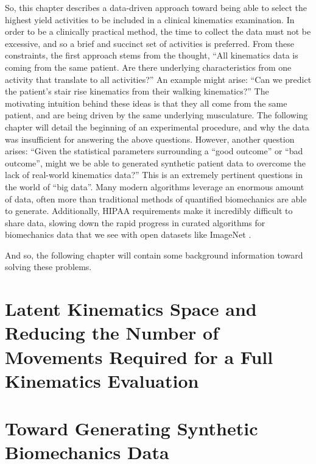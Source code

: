 So, this chapter describes a data-driven approach toward being able to select the highest yield activities to be included in a clinical kinematics examination.
In order to be a clinically practical method, the time to collect the data must not be excessive, and so a brief and succinct set of activities is preferred.
From these constraints, the first approach stems from the thought, ``All kinematics data is coming from the same patient. Are there underlying characteristics from one activity that translate to all activities?''
An example might arise: ``Can we predict the patient's stair rise kinematics from their walking kinematics?''
The motivating intuition behind these ideas is that they all come from the same patient, and are being driven by the same underlying musculature.
The following chapter will detail the beginning of an experimental procedure, and why the data was insufficient for answering the above questions.
However, another question arises: ``Given the statistical parameters surrounding a ``good outcome'' or ``bad outcome'', might we be able to generated synthetic patient data to overcome the lack of real-world kinematics data?''
This is an extremely pertinent questions in the world of ``big data''.
Many modern algorithms leverage an enormous amount of data, often more than traditional methods of quantified biomechanics are able to generate.
Additionally, HIPAA requirements make it incredibly difficult to share data, slowing down the rapid progress in curated algorithms for biomechanics data that we see with open datasets like ImageNet \cite{russakovskyImageNetLargeScale2015}.

And so, the following chapter will contain some background information toward solving these problems.

\section{Latent Kinematics Space and Reducing the Number of Movements Required for a Full Kinematics Evaluation}
\label{sec:latent-kinematics-space}



\section{Toward Generating Synthetic Biomechanics Data}
\label{sec:synthetic-biomechanics-data}





